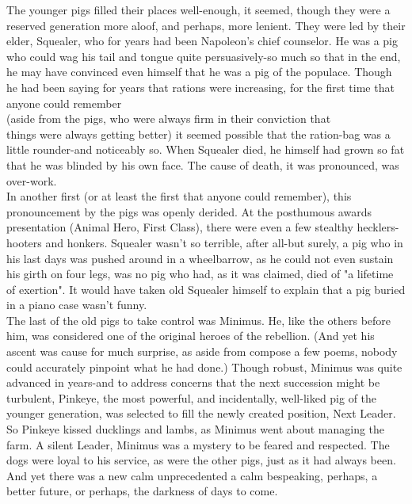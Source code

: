\documentclass{book}
\begin{document}
{{{	The younger pigs filled their places
	well-enough, it seemed,
	though they were a reserved generation more
	aloof, and perhaps, more lenient.
	They were led by their elder, Squealer, who for years
	had been Napoleon's chief counselor. He was a
	pig who could wag his
    tail and tongue quite persuasively-so
	much so that in the end, he may have
	convinced even himself that he was a pig
	of the populace. Though he had been saying for
	years that rations were increasing, for
    the first time that anyone could remember\\
	(aside from the pigs, who were always firm
	in their conviction that\\
	things were always
	getting better) it seemed possible that the
	ration-bag was a little rounder-and noticeably
	so. When Squealer died, he himself had grown
	so fat that he was blinded by his own face.
	The cause of death, it was pronounced,
	was over-work.\\
	In another first (or at least the first that
	anyone could remember), this pronouncement
	by the pigs was openly derided. At the
	posthumous awards presentation (Animal Hero,
	First Class), there were even a few stealthy
	hecklers-hooters and honkers. Squealer wasn't
	so terrible, after all-but surely, a pig who in
	his last days was pushed around in
    a wheelbarrow, as he could not even sustain his
	girth on four legs, was no pig
    who had, as it was claimed, died of "a lifetime
	of exertion". It would have taken old Squealer
	himself to explain that a pig buried in a piano
	case wasn't funny.\\
	The last of the old pigs to take control was
	Minimus. He, like the others before him, was
	considered one of the original heroes of the
	rebellion. (And yet his ascent was cause for
	much surprise, as aside from compose a few poems,
	nobody could accurately pinpoint what he had done.)
	Though robust, Minimus was quite advanced in
	years-and to address concerns that the next
	succession might be turbulent, Pinkeye, the
	most powerful, and incidentally, well-liked
	pig of the younger generation, was selected
	to fill the newly created position, Next Leader.
    So Pinkeye kissed ducklings and lambs, as
	Minimus went about managing the farm. A silent
	Leader, Minimus was a mystery to be feared and
	respected. The dogs were loyal to his service,
	as were the other pigs, just as it had always
	been.\\
	And yet there was a new calm
	unprecedented a
	calm bespeaking, perhaps, a better future, or
	perhaps, the darkness of days to come.\\
}}}
\end{document}
